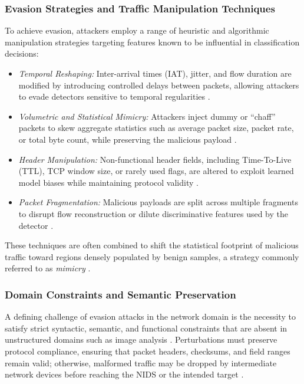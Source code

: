 \subsubsection{Evasion Strategies and Traffic Manipulation Techniques}

To achieve evasion, attackers employ a range of heuristic and algorithmic manipulation strategies targeting features known to be influential in classification decisions:

\begin{itemize}
    \item \textit{Temporal Reshaping:} Inter-arrival times (IAT), jitter, and flow duration are modified by introducing controlled delays between packets, allowing attackers to evade detectors sensitive to temporal regularities \cite{liu2025hard}.
    \item \textit{Volumetric and Statistical Mimicry:} Attackers inject dummy or ``chaff'' packets to skew aggregate statistics such as average packet size, packet rate, or total byte count, while preserving the malicious payload \cite{abdelaty2021gadot}.
    \item \textit{Header Manipulation:} Non-functional header fields, including Time-To-Live (TTL), TCP window size, or rarely used flags, are altered to exploit learned model biases while maintaining protocol validity \cite{guo2025knowml, md2025guardians}.
    \item \textit{Packet Fragmentation:} Malicious payloads are split across multiple fragments to disrupt flow reconstruction or dilute discriminative features used by the detector \cite{debicha2023adv}.
\end{itemize}

These techniques are often combined to shift the statistical footprint of malicious traffic toward regions densely populated by benign samples, a strategy commonly referred to as \emph{mimicry} \cite{li2020adversarial}.

\subsubsection{Domain Constraints and Semantic Preservation}

A defining challenge of evasion attacks in the network domain is the necessity to satisfy strict syntactic, semantic, and functional constraints that are absent in unstructured domains such as image analysis \cite{hartl2020explainability}. 
Perturbations must preserve protocol compliance, ensuring that packet headers, checksums, and field ranges remain valid; otherwise, malformed traffic may be dropped by intermediate network devices before reaching the NIDS or the intended target \cite{wang2023evasion}.

